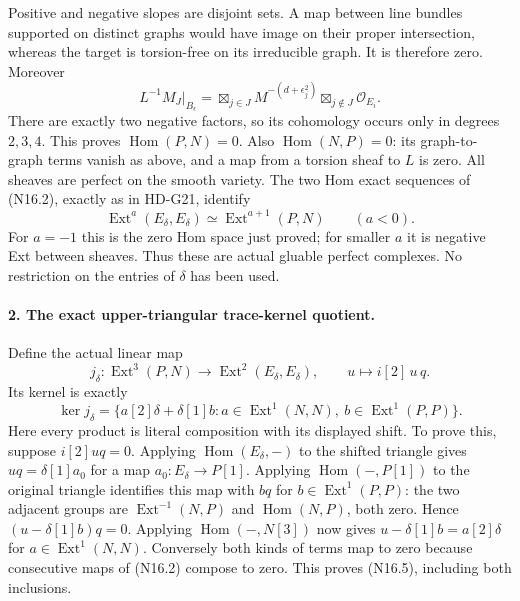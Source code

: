 Positive and negative slopes are disjoint sets. A map between
line bundles supported on distinct graphs would have image on their
proper intersection, whereas the target is torsion-free on its
irreducible graph. It is therefore zero. Moreover
\begin{equation}
 L^{-1}M_J|_{B_\epsilon}
       =\boxtimes_{j\in J}M^{-(d+\epsilon_j^2)}
          \boxtimes_{j\notin J}\mathcal O_{E_i} .       \tag{N16.3}
\end{equation}
There are exactly two negative factors, so its cohomology occurs
only in degrees $2,3,4$. This proves
$\operatorname{Hom}(P,N)=0$. Also
$\operatorname{Hom}(N,P)=0$: its graph-to-graph terms vanish as
above, and a map from a torsion sheaf to $L$ is zero. All sheaves
are perfect on the smooth variety. The two Hom exact sequences of
(N16.2), exactly as in HD-G21, identify
\[
 \operatorname{Ext}^a(E_\delta,E_\delta)
       \simeq\operatorname{Ext}^{a+1}(P,N)\qquad(a<0).
\]
For $a=-1$ this is the zero Hom space just proved; for smaller $a$
it is negative Ext between sheaves. Thus these are actual gluable
perfect complexes. No restriction on the entries of $\delta$ has
been used.

\paragraph{2. The exact upper-triangular trace-kernel quotient.}
Define the actual linear map
\begin{equation}
 j_\delta:\operatorname{Ext}^3(P,N)\longrightarrow
                  \operatorname{Ext}^2(E_\delta,E_\delta),
 \qquad u\longmapsto i[2]\,u\,q.                       \tag{N16.4}
\end{equation}
Its kernel is exactly
\begin{equation}
 \ker j_\delta=
 \{a[2]\delta+\delta[1]b:
       a\in\operatorname{Ext}^1(N,N),\
       b\in\operatorname{Ext}^1(P,P)\}.                \tag{N16.5}
\end{equation}
Here every product is literal composition with its displayed shift.
To prove this, suppose $i[2]uq=0$. Applying
$\operatorname{Hom}(E_\delta,-)$ to the shifted triangle gives
$uq=\delta[1]a_0$ for a map $a_0:E_\delta\to P[1]$.
Applying $\operatorname{Hom}(-,P[1])$ to the original triangle
identifies this map with $bq$ for
$b\in\operatorname{Ext}^1(P,P)$: the two adjacent groups are
$\operatorname{Ext}^{-1}(N,P)$ and $\operatorname{Hom}(N,P)$,
both zero. Hence $(u-\delta[1]b)q=0$. Applying
$\operatorname{Hom}(-,N[3])$ now gives
$u-\delta[1]b=a[2]\delta$ for
$a\in\operatorname{Ext}^1(N,N)$. Conversely both kinds of terms
map to zero because consecutive maps of (N16.2) compose to zero.
This proves (N16.5), including both inclusions.

